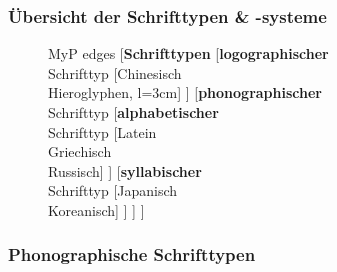 \begin{frame}
\frametitle{Übersicht der Schrifttypen \& -systeme}


\begin{figure}
	\centering
	\begin{forest}
	MyP edges
	[\textbf{Schrifttypen}
		[\textbf{logographischer} \\ Schrifttyp
			[Chinesisch \\ Hieroglyphen, l=3cm]
		]
		[\textbf{phonographischer} \\ Schrifttyp
			[\textbf{alphabetischer} \\ Schrifttyp
				[Latein \\ Griechisch \\ Russisch]
			]
			[\textbf{syllabischer} \\ Schrifttyp
				[Japanisch \\ Koreanisch]
			]
		]
	]
	\end{forest}
\end{figure}

\end{frame}


\subsubsection{Phonographische Schrifttypen}

